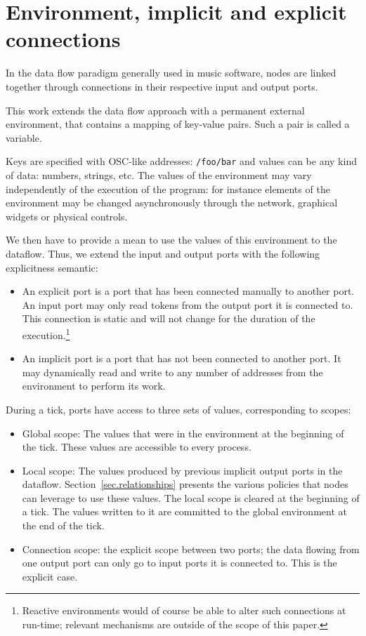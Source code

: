 \documentclass{article}
\begin{document}
    
\section{Environment, implicit and explicit connections}
In the data flow paradigm generally used in music software, nodes are linked together through connections in their respective input and output ports.
    
This work extends the data flow approach with a permanent external environment, that contains a mapping of key-value pairs. 
Such a pair is called a variable.

Keys are specified with OSC-like\cite{Freed09featuresand} addresses: \lstinline|/foo/bar| and values can be any kind of data: numbers, strings, etc. 
The values of the environment may vary independently of the execution of the program: for instance elements of the environment may be changed asynchronously through the network, graphical widgets or physical controls.
    
We then have to provide a mean to use the values of this environment to the dataflow.
Thus, we extend the input and output ports with the following explicitness semantic: 
    
\begin{itemize}
  \item{An explicit port is a port that has been connected manually to another port.
        An input port may only read tokens from the output port it is connected to.
        This connection is static and will not change for the duration of the execution.\footnote{Reactive environments would of course be able to alter such connections at run-time; relevant mechanisms are outside of the scope of this paper.}} 
  \item{An implicit port is a port that has not been connected to another port. 
        It may dynamically read and write to any number of addresses from the environment to perform its work.}
\end{itemize}
    
During a tick, ports have access to three sets of values, corresponding to scopes: 
\begin{itemize}
  \item {Global scope: The values that were in the environment at the beginning of the tick. 
  These values are accessible to every process.}
  \item {Local scope: The values produced by previous implicit output ports in the dataflow.
        Section~\ref{sec.relationships} presents the various policies that nodes can leverage to use these values. 
        The local scope is cleared at the beginning of a tick. 
        The values written to it are committed to the global environment at the end of the tick.}
  \item{Connection scope: the explicit scope between two ports; the data flowing from one output port can only go to input ports it is connected to. This is the explicit case.}
\end{itemize}
\end{document}

